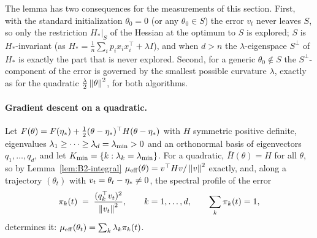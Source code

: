 The lemma has two consequences for the measurements of this section. First, with the standard initialization
$\theta_0=0$ (or any $\theta_0\in S$) the error $v_t$ never leaves $S$, so only the restriction $H_\ast|_S$ of the Hessian
at the optimum to $S$ is explored; $S$ is $H_\ast$-invariant (as $H_\ast=\frac1n\sum_ip_ix_ix_i^\top+\lambda I$), and
when $d>n$ the $\lambda$-eigenspace $S^\perp$ of $H_\ast$ is exactly the part that is never explored. Second, for a
generic $\theta_0\notin S$ the $S^\perp$-component of the error is governed by the smallest possible curvature $\lambda$,
exactly as for the quadratic $\frac\lambda2\left\|\theta\right\|^2$, for both algorithms.

\paragraph{Gradient descent on a quadratic.}
Let $F(\theta)=F(\eta_\ast)+\frac12(\theta-\eta_\ast)^\top H(\theta-\eta_\ast)$ with $H$ symmetric positive definite,
eigenvalues $\lambda_1\ge\dots\ge\lambda_d=\lambda_{\min}>0$ and an orthonormal basis of eigenvectors $q_1,\dots,q_d$, and let
$K_{\min}=\{k:\lambda_k=\lambda_{\min}\}$. For a quadratic, $\bar H(\theta)=H$ for all $\theta$, so by
Lemma~\ref{lem:B2-integral} $\mu_{\mathrm{eff}}(\theta)=v^\top Hv/\left\|v\right\|^2$ exactly, and, along a trajectory $(\theta_t)$ with
$v_t=\theta_t-\eta_\ast\neq0$, the spectral profile of the error
\begin{equation}\label{eq:B2-profile}
\pi_k(t)\;=\;\frac{(q_k^\top v_t)^2}{\left\|v_t\right\|^2},\qquad k=1,\dots,d,\qquad\sum_k\pi_k(t)=1,
\end{equation}
determines it: $\mu_{\mathrm{eff}}(\theta_t)=\sum_k\lambda_k\pi_k(t)$.

